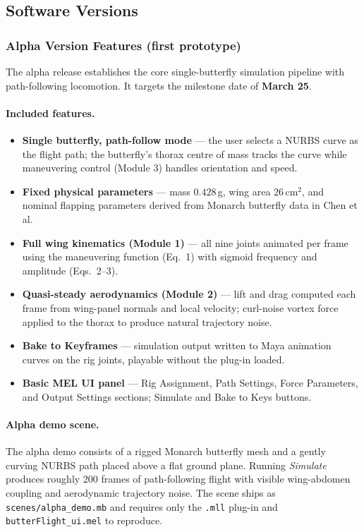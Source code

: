 \documentclass[12pt]{article}
\begin{document}
\subsection{Software Versions}

\subsubsection{Alpha Version Features (first prototype)}

The alpha release establishes the core single-butterfly simulation pipeline with
path-following locomotion. It targets the milestone date of \textbf{March 25}.

\paragraph{Included features.}
\begin{itemize}
  \item \textbf{Single butterfly, path-follow mode} --- the user selects a NURBS
    curve as the flight path; the butterfly's thorax centre of mass tracks the
    curve while maneuvering control (Module 3) handles orientation and speed.
  \item \textbf{Fixed physical parameters} --- mass $0.428\,$g,
    wing area $26\,$cm$^2$, and nominal flapping parameters derived from
    Monarch butterfly data in Chen et al.
  \item \textbf{Full wing kinematics (Module 1)} --- all nine joints animated per
    frame using the maneuvering function (Eq.~1) with sigmoid frequency and
    amplitude (Eqs.~2--3).
  \item \textbf{Quasi-steady aerodynamics (Module 2)} --- lift and drag computed
    each frame from wing-panel normals and local velocity; curl-noise vortex force
    applied to the thorax to produce natural trajectory noise.
  \item \textbf{Bake to Keyframes} --- simulation output written to Maya animation
    curves on the rig joints, playable without the plug-in loaded.
  \item \textbf{Basic MEL UI panel} --- Rig Assignment, Path Settings, Force
    Parameters, and Output Settings sections; Simulate and Bake to Keys buttons.
\end{itemize}

\paragraph{Alpha demo scene.}
The alpha demo consists of a rigged Monarch butterfly mesh and a gently curving
NURBS path placed above a flat ground plane. Running \textit{Simulate} produces
roughly 200 frames of path-following flight with visible wing-abdomen coupling and
aerodynamic trajectory noise. The scene ships as \texttt{scenes/alpha\_demo.mb}
and requires only the \texttt{.mll} plug-in and \texttt{butterFlight\_ui.mel} to
reproduce.
\end{document}
